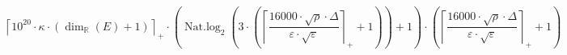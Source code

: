 \[\left\lceil 10^{20} \cdot \kappa \cdot \left(\dim_{\mathbb{R}}\left(E\right) + 1\right) \right\rceil_{+} \cdot \left(\operatorname{Nat.log}_{2}\left(3 \cdot \left(\left\lceil \frac{16000 \cdot \sqrt{\rho} \cdot \Delta}{\varepsilon \cdot \sqrt{\varepsilon}} \right\rceil_{+} + 1\right)\right) + 1\right) \cdot \left(\left\lceil \frac{16000 \cdot \sqrt{\rho} \cdot \Delta}{\varepsilon \cdot \sqrt{\varepsilon}} \right\rceil_{+} + 1\right)\]
